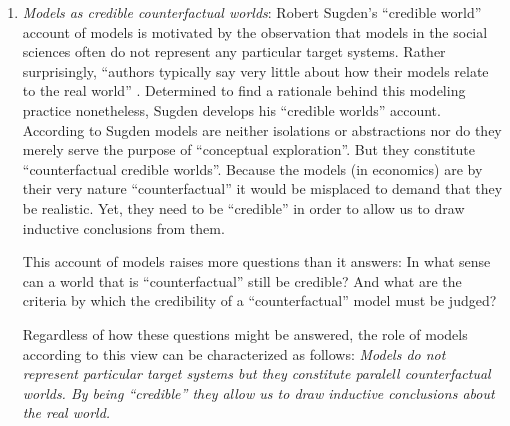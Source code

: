 \documentclass[onecollarge]{STJour}
\numberwithin{equation}{section}
\begin{document}
\begin{enumerate}
  {\em Models help us to understand the world, because they allow us to
  study the functioning of causal mechanisms in isolation which in the
  real world are usually mixed up with other mechanisms.}
  
  \item {\em Models as credible counterfactual worlds}: Robert Sugden's
  ``credible world'' account of models \citep[]{sugden:2000,
  sugden:2009} is motivated by the observation that models in the social
  sciences often do not represent any particular target systems. Rather
  surprisingly, ``authors typically say very little about how their
  models relate to the real world'' \citep[p.\ 25]{sugden:2009}.
  Determined to find a rationale behind this modeling practice
  nonetheless, Sugden develops his ``credible worlds'' account.
  According to Sugden models are neither isolations or abstractions nor
  do they merely serve the purpose of ``conceptual exploration''. But
  they constitute ``counterfactual credible worlds''. Because the models
  (in economics) are by their very nature ``counterfactual'' it would be
  misplaced to demand that they be realistic. Yet, they need to be
  ``credible'' in order to allow us to draw inductive conclusions from
  them.
  
  This account of models raises more questions than it answers: In what
  sense can a world that is ``counterfactual'' still be credible? And
  what are the criteria by which the credibility of a ``counterfactual''
  model must be judged?
  
  Regardless of how these questions might be answered, the role of
  models according to this view can be characterized as follows: {\em
  Models do not represent particular target systems but they constitute
  paralell counterfactual worlds. By being ``credible'' they allow us to
  draw inductive conclusions about the real world.}


\end{enumerate}
\end{document}
